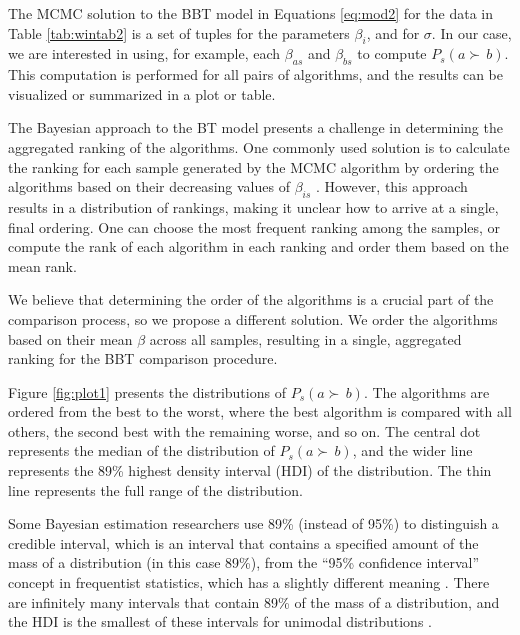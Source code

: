 \documentclass[twoside,11pt,preprint]{article}
\begin{document}
The MCMC solution to the BBT model in Equations \ref{eq:mod2} for the data in
Table \ref{tab:wintab2} is a set of tuples for the parameters
\(\beta_{i}\), and for \(\sigma\). In our case, we are interested in
using, for example, each \(\beta_{as}\) and \(\beta_{bs}\) to compute
\(P_s(a \succ\,b)\). This computation is performed for all pairs of algorithms, and the results can be visualized or summarized in a plot or table.

The Bayesian approach to the BT model presents a challenge in determining the aggregated ranking of the algorithms. One commonly used solution is to calculate the ranking for each sample generated by the MCMC algorithm by ordering the algorithms based on their decreasing values of \(\beta_{is}\) \citep[\citet{issa2021bayesian}]{btstan}. However, this approach results in a distribution of rankings, making it unclear how to arrive at a single, final ordering. One can choose the most frequent ranking among the samples, or compute the rank of each algorithm in each ranking and order them based on the mean rank.

We believe that determining the order of the algorithms is a crucial part of the comparison process, so we propose a different solution. We order the algorithms based on their mean \(\beta\) across all samples, resulting in a single, aggregated ranking for the BBT comparison procedure.

Figure \ref{fig:plot1} presents the distributions of \(P_s(a \succ\,b)\). The algorithms are ordered from the best to the worst, where the best algorithm is compared with all others, the second best with the remaining worse, and so on. The central dot represents the median of the distribution of \(P_s(a \succ\,b)\), and the wider line represents the 89\% highest density interval (HDI) of the distribution. The thin line represents the full range of the distribution.

Some Bayesian estimation researchers use 89\% (instead of 95\%) to distinguish a credible interval, which is an interval that contains a specified amount of the mass of a distribution (in this case 89\%), from the ``95\% confidence interval'' concept in frequentist statistics, which has a slightly different meaning \citep{makowski2019bayestestr}. There are infinitely many intervals that contain 89\% of the mass of a distribution, and the HDI is the smallest of these intervals for unimodal distributions \citep{kruschke2014doing}.
\end{document}
